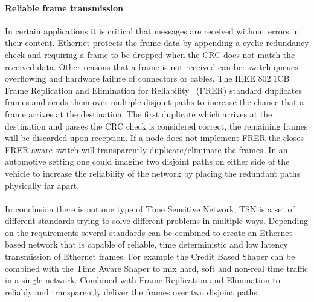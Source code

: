\paragraph{Reliable frame transmission} In certain applications it is critical that messages are received without errors in their content. Ethernet protects the frame data by appending a cyclic redundancy check and requiring a frame to be dropped when the CRC does not match the received data. Other reasons that a frame is not received can be: switch queues overflowing and hardware failure of connectors or cables. The IEEE 802.1CB Frame Replication and Elimination for Reliability~\cite{IEEE8021CB} (FRER) standard duplicates frames and sends them over multiple disjoint paths to increase the chance that a frame arrives at the destination. The first duplicate which arrives at the destination and passes the CRC check is considered correct, the remaining frames will be discarded upon reception. If a node does not implement FRER the closes FRER aware switch will transparently duplicate/eliminate the frames. In an automotive setting one could imagine two disjoint paths on either side of the vehicle to increase the reliability of the network by placing the redundant paths physically far apart.

\paragraph{}In conclusion there is not one type of Time Sensitive Network, TSN is a set of different standards trying to solve different problems in multiple ways. Depending on the requirements several standards can be combined to create an Ethernet based network that is capable of reliable, time deterministic and low latency transmission of Ethernet frames. For example the Credit Based Shaper can be combined with the Time Aware Shaper to mix hard, soft and non-real time traffic in a single network. Combined with Frame Replication and Elimination to reliably and transparently deliver the frames over two disjoint paths.
